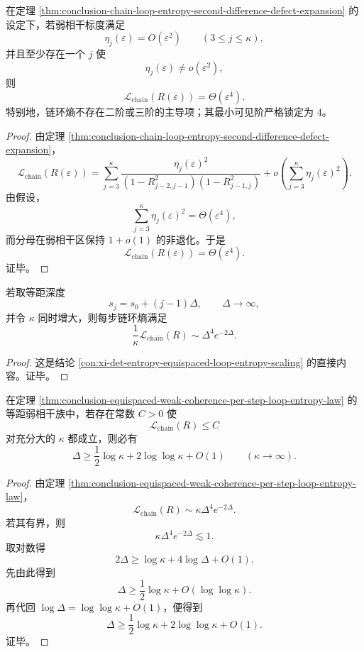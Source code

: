 \begin{corollary}[链环熵的最小可见阶在弱相干标度下锁定为四]\label{cor:conclusion-chain-loop-entropy-visible-order-locked-at-four}
在定理 \ref{thm:conclusion-chain-loop-entropy-second-difference-defect-expansion} 的设定下，若弱相干标度满足
\[
\eta_j(\varepsilon)=O(\varepsilon^2)
\qquad (3\le j\le \kappa),
\]
并且至少存在一个 \(j\) 使
\[
\eta_j(\varepsilon)\not=o(\varepsilon^2),
\]
则
\[
\mathcal L_{\mathrm{chain}}(R(\varepsilon))=\Theta(\varepsilon^4).
\]
特别地，链环熵不存在二阶或三阶的主导项；其最小可见阶严格锁定为 \(4\)。
\end{corollary}
\begin{proof}
由定理 \ref{thm:conclusion-chain-loop-entropy-second-difference-defect-expansion}，
\[
\mathcal L_{\mathrm{chain}}(R(\varepsilon))
=
\sum_{j=3}^{\kappa}
\frac{\eta_j(\varepsilon)^2}
{(1-R_{j-2,j-1}^2)(1-R_{j-1,j}^2)}
+
o\!\left(\sum_{j=3}^{\kappa}\eta_j(\varepsilon)^2\right).
\]
由假设，
\[
\sum_{j=3}^{\kappa}\eta_j(\varepsilon)^2=\Theta(\varepsilon^4),
\]
而分母在弱相干区保持 \(1+o(1)\) 的非退化。于是
\[
\mathcal L_{\mathrm{chain}}(R(\varepsilon))=\Theta(\varepsilon^4).
\]
证毕。
\end{proof}

\begin{theorem}[等距弱相干相的每步环熵指数律]\label{thm:conclusion-equispaced-weak-coherence-per-step-loop-entropy-law}
若取等距深度
\[
s_j=s_0+(j-1)\Delta,
\qquad
\Delta\to\infty,
\]
并令 \(\kappa\) 同时增大，则每步链环熵满足
\[
\frac{1}{\kappa}\mathcal L_{\mathrm{chain}}(R)\sim \Delta^4 e^{-2\Delta}.
\]
\end{theorem}
\begin{proof}
这是结论 \ref{con:xi-det-entropy-equispaced-loop-entropy-scaling} 的直接内容。证毕。
\end{proof}

\begin{corollary}[有界总环熵强迫至少半对数间距]\label{cor:conclusion-bounded-total-loop-entropy-forces-half-log-spacing}
在定理 \ref{thm:conclusion-equispaced-weak-coherence-per-step-loop-entropy-law} 的等距弱相干族中，若存在常数 \(C>0\) 使
\[
\mathcal L_{\mathrm{chain}}(R)\le C
\]
对充分大的 \(\kappa\) 都成立，则必有
\[
\Delta \ge \frac12\log \kappa + 2\log\log \kappa + O(1)
\qquad (\kappa\to\infty).
\]
\end{corollary}
\begin{proof}
由定理 \ref{thm:conclusion-equispaced-weak-coherence-per-step-loop-entropy-law}，
\[
\mathcal L_{\mathrm{chain}}(R)\sim \kappa \Delta^4 e^{-2\Delta}.
\]
若其有界，则
\[
\kappa \Delta^4 e^{-2\Delta}\lesssim 1.
\]
取对数得
\[
2\Delta \ge \log\kappa + 4\log\Delta + O(1).
\]
先由此得到
\[
\Delta\ge \frac12\log\kappa + O(\log\log\kappa).
\]
再代回 \(\log\Delta=\log\log\kappa+O(1)\)，便得到
\[
\Delta \ge \frac12\log \kappa + 2\log\log \kappa + O(1).
\]
证毕。
\end{proof}

